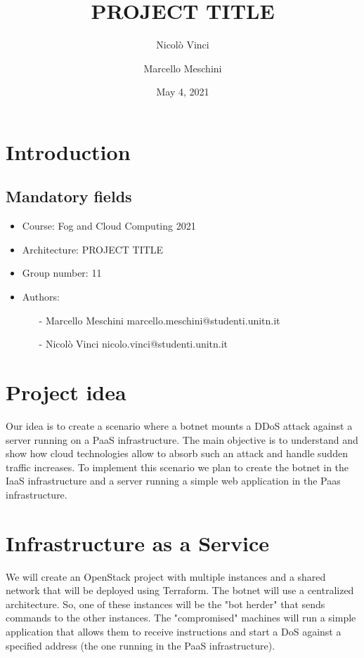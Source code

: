 \documentclass{article}
\title{PROJECT TITLE}
\author{Nicolò Vinci  \\
	\and 
	Marcello Meschini \\
	}
\date{May 4, 2021}
\begin{document}
\maketitle

\section{Introduction}
\label{intro}

\subsection{Mandatory fields}
\label{mfields}

\begin{itemize}
\item Course: Fog and Cloud Computing 2021
\item Architecture: PROJECT TITLE
\item Group number: 11
\item Authors:

\begin{itemize}
\item[-] Marcello Meschini marcello.meschini@studenti.unitn.it
\item[-] Nicolò Vinci nicolo.vinci@studenti.unitn.it
\end{itemize}

\end{itemize}

\section{Project idea} 
\label{idea}
Our idea is to create a scenario where a botnet mounts a DDoS attack against a server running on a PaaS infrastructure. The main objective is to understand and show how cloud technologies allow to absorb such an attack and handle sudden traffic increases. 
To implement this scenario we plan to create the botnet in the IaaS infrastructure and a server running a simple web application in the Paas infrastructure.

\section{Infrastructure as a Service}
\label{iass}
We will create an OpenStack project with multiple instances and a shared network that will be deployed using Terraform. The botnet will use a centralized architecture. So, one of these instances will be the "bot herder" that sends commands to the other instances. The "compromised" machines will run a simple application that allows them to receive instructions and start a DoS against a specified address (the one running in the PaaS infrastructure).
\end{document}
